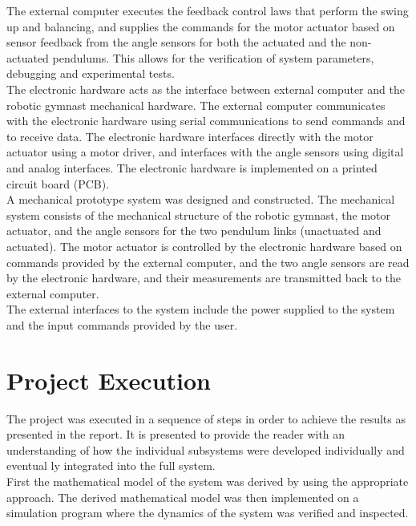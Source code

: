 The external computer executes the feedback control laws that perform the swing up and balancing, and supplies the commands for the motor actuator based on sensor feedback from the angle sensors for both the actuated and the non-actuated pendulums. This allows for the verification of system parameters, debugging and experimental tests.\\

The electronic hardware acts as the interface between external computer and the robotic gymnast mechanical hardware. The external computer communicates with the electronic hardware using serial communications to send commands and to receive data. The electronic hardware interfaces directly with the motor actuator using a motor driver, and interfaces with the angle sensors using digital and analog interfaces. The electronic hardware is implemented on a printed circuit board (PCB).\\

A mechanical prototype system was designed and constructed. The mechanical system consists of the mechanical structure of the robotic gymnast, the motor actuator, and the angle sensors for the two pendulum links (unactuated and actuated). The motor actuator is controlled by the electronic hardware based on commands provided by the external computer, and the two angle sensors are read by the electronic hardware, and their measurements are transmitted back to the external computer.\\

The external interfaces to the system include the power supplied to the system and the input commands provided by the user.

\section{Project Execution}

The project was executed in a sequence of steps in order to achieve the results as presented in the report. It is presented to provide the reader with an understanding of how the individual subsystems were developed individually and eventual	ly integrated into the full system.\\
 
First the mathematical model of the system was derived by using the appropriate approach. The derived mathematical model was then implemented on a simulation program where the dynamics of the system was verified and inspected.\\


